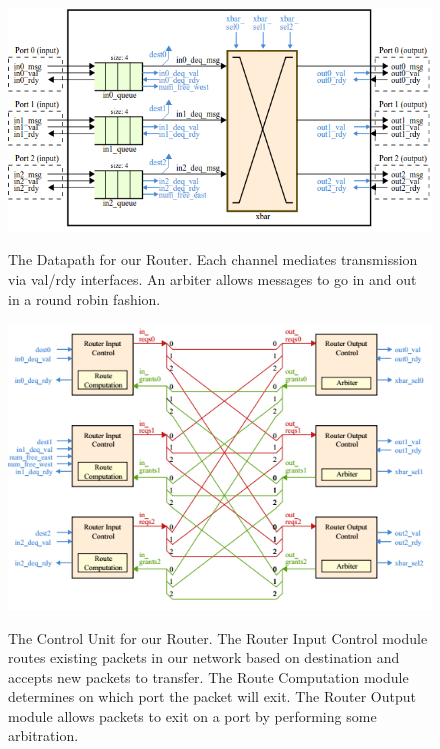 \documentclass[10pt]{article}
\begin{document}
\begin{figure}[h]
	\centering
	\includegraphics[scale=0.7]{dpath}
	\label{fig:dpath}
	\caption
	{
		The Datapath for our Router.
		Each channel mediates transmission via val/rdy interfaces.
		An arbiter allows messages to go in and out in a round robin fashion.
	}
\end{figure}

\begin{figure}[h]
	\centering
	\includegraphics[scale=0.7]{baselinectrl}
	\label{fig:ctrl}
	\caption
	{
		The Control Unit for our Router.
		The Router Input Control module routes existing packets in our network 
		based on destination and accepts new packets to transfer.
		The Route Computation module determines on which port the packet will
		exit.
		The Router Output module allows packets to exit on a port by performing
		some arbitration. 
	}
\end{figure}
\end{document}
